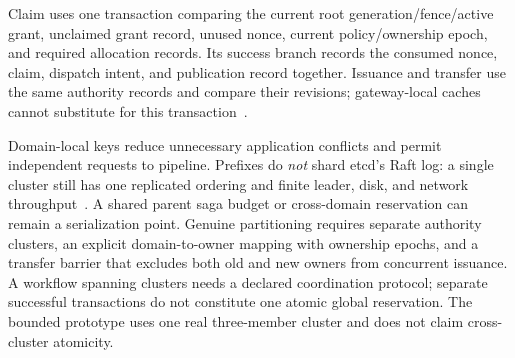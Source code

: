 Claim uses one transaction comparing the current root generation/fence/active grant, unclaimed grant record, unused nonce, current policy/ownership epoch, and required allocation records. Its success branch records the consumed nonce, claim, dispatch intent, and publication record together. Issuance and transfer use the same authority records and compare their revisions; gateway-local caches cannot substitute for this transaction~\cite{etcd2026,etcdguarantees2026}.

Domain-local keys reduce unnecessary application conflicts and permit independent requests to pipeline. Prefixes do \emph{not} shard etcd's Raft log: a single cluster still has one replicated ordering and finite leader, disk, and network throughput~\cite{etcdperformance2026}. A shared parent saga budget or cross-domain reservation can remain a serialization point. Genuine partitioning requires separate authority clusters, an explicit domain-to-owner mapping with ownership epochs, and a transfer barrier that excludes both old and new owners from concurrent issuance. A workflow spanning clusters needs a declared coordination protocol; separate successful transactions do not constitute one atomic global reservation. The bounded prototype uses one real three-member cluster and does not claim cross-cluster atomicity.

